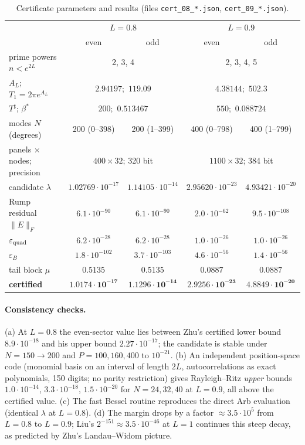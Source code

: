 \documentclass[11pt,a4paper]{article}
\theoremstyle{remark}
\theoremstyle{definition}
\newcommand{\eps}{\varepsilon}
\begin{document}
\begin{table}[h]
\centering\small
\begin{tabular}{@{}lcccc@{}}
\toprule
 & \multicolumn{2}{c}{$L=0.8$} & \multicolumn{2}{c}{$L=0.9$}\\
 & even & odd & even & odd\\
\midrule
prime powers $n<e^{2L}$ & \multicolumn{2}{c}{2, 3, 4} & \multicolumn{2}{c}{2, 3, 4, 5}\\
$A_L$; $T_1=2\pi e^{A_L}$ & \multicolumn{2}{c}{$2.94197$;\ $119.09$} & \multicolumn{2}{c}{$4.38144$;\ $502.3$}\\
$T^\sharp$; $\beta^*$ & \multicolumn{2}{c}{$200$;\ $0.513467$} & \multicolumn{2}{c}{$550$;\ $0.088724$}\\
modes $N$ (degrees) & 200 (0--398) & 200 (1--399) & 400 (0--798) & 400 (1--799)\\
panels $\times$ nodes; precision & \multicolumn{2}{c}{$400\times32$; 320 bit} & \multicolumn{2}{c}{$1100\times32$; 384 bit}\\
\midrule
candidate $\lambda$ & $1.02769\cdot10^{-17}$ & $1.14105\cdot10^{-14}$ & $2.95620\cdot10^{-23}$ & $4.93421\cdot10^{-20}$\\
Rump residual $\|E\|_F$ & $6.1\cdot10^{-90}$ & $6.1\cdot10^{-90}$ & $2.0\cdot10^{-62}$ & $9.5\cdot10^{-108}$\\
$\eps_{\rm quad}$ & $6.2\cdot10^{-28}$ & $6.2\cdot10^{-28}$ & $1.0\cdot10^{-26}$ & $1.0\cdot10^{-26}$\\
$\eps_B$ & $1.8\cdot10^{-102}$ & $3.7\cdot10^{-103}$ & $4.6\cdot10^{-56}$ & $1.4\cdot10^{-56}$\\
tail block $\mu$ & $0.5135$ & $0.5135$ & $0.0887$ & $0.0887$\\
\textbf{certified} & $\mathbf{1.0174\cdot10^{-17}}$ & $\mathbf{1.1296\cdot10^{-14}}$ & $\mathbf{2.9256\cdot10^{-23}}$ & $\mathbf{4.8849\cdot10^{-20}}$\\
\bottomrule
\end{tabular}
\caption{Certificate parameters and results (files \texttt{cert\_08\_*.json}, \texttt{cert\_09\_*.json}).}
\label{tab:cert}
\end{table}

\paragraph{Consistency checks.}
(a) At $L=0.8$ the even-sector value lies between Zhu's certified lower bound $8.9\cdot10^{-18}$ and his upper bound $2.27\cdot10^{-17}$; the candidate is stable under $N=150\to200$ and $P=100,160,400$ to $10^{-21}$.
(b) An independent position-space code (monomial basis on an interval of length $2L$, autocorrelations as exact polynomials, 150 digits; no parity restriction) gives Rayleigh--Ritz \emph{upper} bounds $1.0\cdot10^{-14}$, $3.3\cdot10^{-18}$, $1.5\cdot10^{-20}$ for $N=24,32,40$ at $L=0.9$, all above the certified value.
(c) The fast Bessel routine reproduces the direct Arb evaluation (identical $\lambda$ at $L=0.8$).
(d) The margin drops by a factor $\approx3.5\cdot10^{5}$ from $L=0.8$ to $L=0.9$; Liu's $2^{-151}\approx3.5\cdot10^{-46}$ at $L=1$ continues this steep decay, as predicted by Zhu's Landau--Widom picture.
\end{document}
